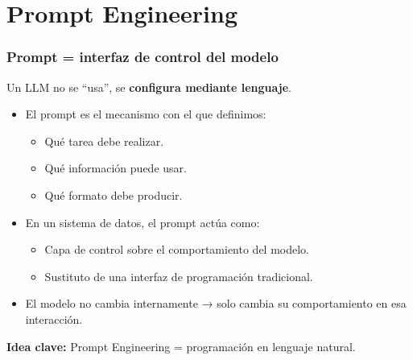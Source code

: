 \documentclass[aspectratio=169]{beamer}
\begin{document}
\section{Prompt Engineering}
\frame{\sectionpage}

\begin{frame}\frametitle{Prompt = interfaz de control del modelo}

Un LLM no se “usa”, se \textbf{configura mediante lenguaje}.

\vspace{0.4em}

\begin{itemize}
    \item El prompt es el mecanismo con el que definimos:
    \begin{itemize}
        \item Qué tarea debe realizar.
        \item Qué información puede usar.
        \item Qué formato debe producir.
    \end{itemize}

    \vspace{0.3em}

    \item En un sistema de datos, el prompt actúa como:
    \begin{itemize}
        \item Capa de control sobre el comportamiento del modelo.
        \item Sustituto de una interfaz de programación tradicional.
    \end{itemize}

    \vspace{0.3em}

    \item El modelo no cambia internamente → solo cambia su comportamiento en esa interacción.
\end{itemize}

\vspace{0.3em}
\textbf{Idea clave:} Prompt Engineering = programación en lenguaje natural.
\end{frame}
\end{document}
